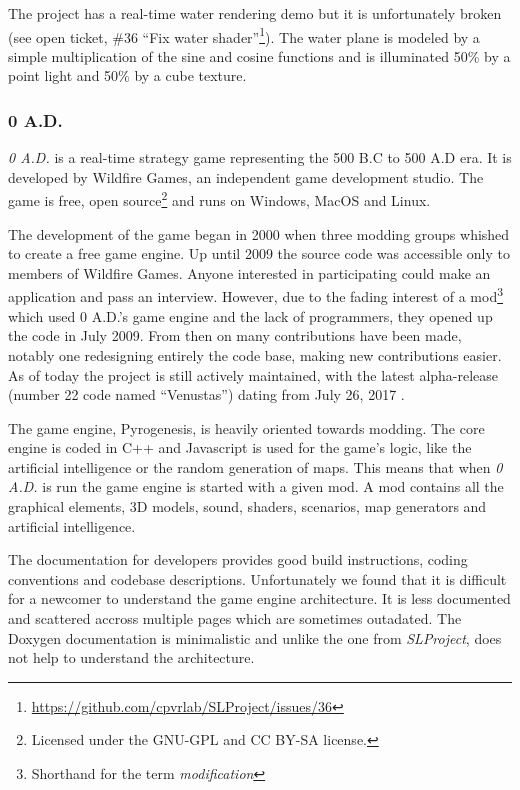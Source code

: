 The project has a real-time water rendering demo but it is unfortunately broken
(see open ticket, \#36 ``Fix water
shader''\footnote{\url{https://github.com/cpvrlab/SLProject/issues/36}}). The
water plane is modeled by a simple multiplication of the sine and cosine
functions and is illuminated 50\% by a point light and 50\% by a cube texture.


\subsubsection{0 A.D.}

\textit{0 A.D.} is a real-time strategy game representing the 500 B.C to 500 A.D
era. It is developed by Wildfire Games, an independent game development studio.
The game is free, open source\footnote{Licensed under the GNU-GPL and CC BY-SA
license.} and runs on Windows, MacOS and Linux.

The development of the game began in 2000 when three modding groups whished to
create a free game engine. Up until 2009 the source code was accessible only to
members of Wildfire Games. Anyone interested in participating could make an
application and pass an interview. However, due to the fading interest of a
mod\footnote{Shorthand for the term \textit{modification}} which used 0 A.D.'s
game engine and the lack of programmers, they opened up the code in July 2009.
From then on many contributions have been made, notably one redesigning entirely
the code base, making new contributions easier. As of today the project is still
actively maintained, with the latest alpha-release (number 22 code named
``Venustas'') dating from July 26,
2017 \autocite{wildfire0adproject,wildfire0adstory}.

The game engine, Pyrogenesis, is heavily oriented towards modding. The core
engine is coded in C++ and Javascript is used for the game's logic, like the
artificial intelligence or the random generation of maps. This means that when
\textit{0 A.D.} is run the game engine is started with a given mod. A mod
contains all the graphical elements, 3D models, sound, shaders, scenarios, map
generators and artificial intelligence.

The documentation for developers provides good build instructions, coding
conventions and codebase descriptions. Unfortunately we found that it is
difficult for a newcomer to understand the game engine architecture. It is less
documented and scattered accross multiple pages which are sometimes outadated.
The Doxygen documentation is minimalistic and unlike the one from
\textit{SLProject}, does not help to understand the architecture.

